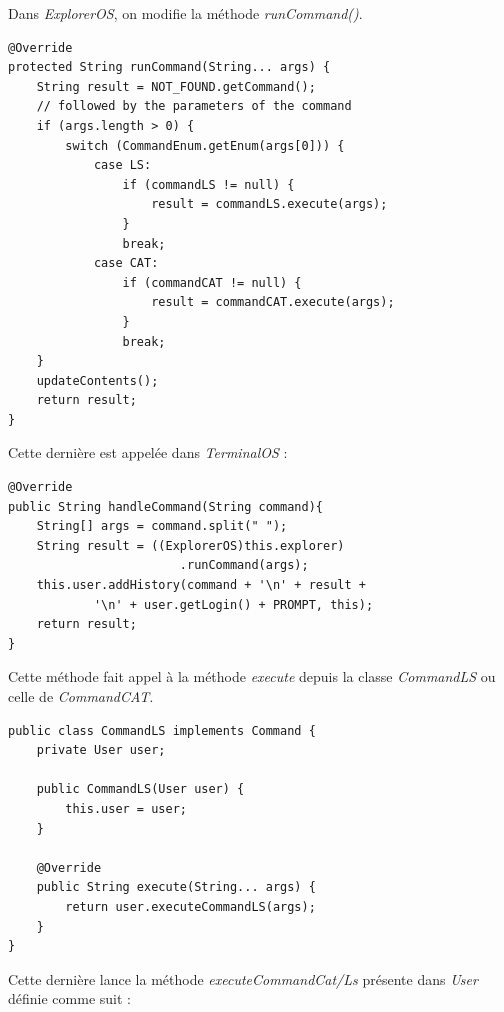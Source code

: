 Dans \emph{ExplorerOS}, on modifie la méthode \emph{runCommand()}.

\begin{lstlisting}
@Override
protected String runCommand(String... args) {
	String result = NOT_FOUND.getCommand();
	// followed by the parameters of the command
	if (args.length > 0) {
		switch (CommandEnum.getEnum(args[0])) {
			case LS:
				if (commandLS != null) {
					result = commandLS.execute(args);
				}
				break;
			case CAT:
				if (commandCAT != null) {
					result = commandCAT.execute(args);
				}
				break;
	}
	updateContents();
	return result;
}
\end{lstlisting}

Cette dernière est appelée dans \emph{TerminalOS} :

\begin{lstlisting}
@Override
public String handleCommand(String command){
	String[] args = command.split(" ");
	String result = ((ExplorerOS)this.explorer)
						.runCommand(args);
	this.user.addHistory(command + '\n' + result + 
			'\n' + user.getLogin() + PROMPT, this);
	return result;
}
\end{lstlisting}

Cette méthode fait appel à la méthode \emph{execute} depuis la classe \emph{CommandLS} ou celle de \emph{CommandCAT}.

\begin{lstlisting}
public class CommandLS implements Command {
    private User user;

    public CommandLS(User user) {
        this.user = user;
    }

    @Override
    public String execute(String... args) {
        return user.executeCommandLS(args);
    }
}
\end{lstlisting}

Cette dernière lance la méthode \emph{executeCommandCat/Ls} présente dans \emph{User} définie comme suit :



